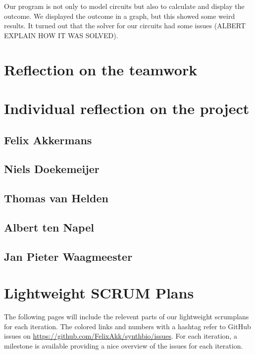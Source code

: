 \documentclass[a4paper]{article}
\begin{document}
Our program is not only to model circuits but also to calculate and display the outcome. We displayed the outcome in a graph, but this showed some weird results. It turned out that the solver for our circuits had some issues (ALBERT EXPLAIN HOW IT WAS SOLVED).

\section{Reflection on the teamwork}

\section{Individual reflection on the project} %
\subsection{Felix Akkermans}
\subsection{Niels Doekemeijer}
\subsection{Thomas van Helden}
\subsection{Albert ten Napel}
\subsection{Jan Pieter Waagmeester}

\section{Lightweight SCRUM Plans}
The following pages will include the relevent parts of our lightweight scrumplans for each iteration. The colored links and numbers with a hashtag refer to GitHub issues on \url{https://github.com/FelixAkk/synthbio/issues}. For each iteration, a milestone is available providing a nice overview of the issues for each iteration.






\end{document}

